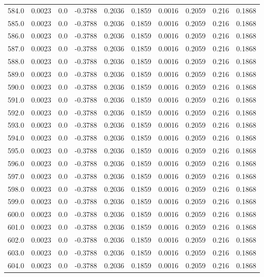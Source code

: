 \begin{longtable}{lrrrrrrrrr}
584.0 & 0.0023 & 0.0 & -0.3788 & 0.2036 & 0.1859 & 0.0016 & 0.2059 & 0.216 & 0.1868 \\
585.0 & 0.0023 & 0.0 & -0.3788 & 0.2036 & 0.1859 & 0.0016 & 0.2059 & 0.216 & 0.1868 \\
586.0 & 0.0023 & 0.0 & -0.3788 & 0.2036 & 0.1859 & 0.0016 & 0.2059 & 0.216 & 0.1868 \\
587.0 & 0.0023 & 0.0 & -0.3788 & 0.2036 & 0.1859 & 0.0016 & 0.2059 & 0.216 & 0.1868 \\
588.0 & 0.0023 & 0.0 & -0.3788 & 0.2036 & 0.1859 & 0.0016 & 0.2059 & 0.216 & 0.1868 \\
589.0 & 0.0023 & 0.0 & -0.3788 & 0.2036 & 0.1859 & 0.0016 & 0.2059 & 0.216 & 0.1868 \\
590.0 & 0.0023 & 0.0 & -0.3788 & 0.2036 & 0.1859 & 0.0016 & 0.2059 & 0.216 & 0.1868 \\
591.0 & 0.0023 & 0.0 & -0.3788 & 0.2036 & 0.1859 & 0.0016 & 0.2059 & 0.216 & 0.1868 \\
592.0 & 0.0023 & 0.0 & -0.3788 & 0.2036 & 0.1859 & 0.0016 & 0.2059 & 0.216 & 0.1868 \\
593.0 & 0.0023 & 0.0 & -0.3788 & 0.2036 & 0.1859 & 0.0016 & 0.2059 & 0.216 & 0.1868 \\
594.0 & 0.0023 & 0.0 & -0.3788 & 0.2036 & 0.1859 & 0.0016 & 0.2059 & 0.216 & 0.1868 \\
595.0 & 0.0023 & 0.0 & -0.3788 & 0.2036 & 0.1859 & 0.0016 & 0.2059 & 0.216 & 0.1868 \\
596.0 & 0.0023 & 0.0 & -0.3788 & 0.2036 & 0.1859 & 0.0016 & 0.2059 & 0.216 & 0.1868 \\
597.0 & 0.0023 & 0.0 & -0.3788 & 0.2036 & 0.1859 & 0.0016 & 0.2059 & 0.216 & 0.1868 \\
598.0 & 0.0023 & 0.0 & -0.3788 & 0.2036 & 0.1859 & 0.0016 & 0.2059 & 0.216 & 0.1868 \\
599.0 & 0.0023 & 0.0 & -0.3788 & 0.2036 & 0.1859 & 0.0016 & 0.2059 & 0.216 & 0.1868 \\
600.0 & 0.0023 & 0.0 & -0.3788 & 0.2036 & 0.1859 & 0.0016 & 0.2059 & 0.216 & 0.1868 \\
601.0 & 0.0023 & 0.0 & -0.3788 & 0.2036 & 0.1859 & 0.0016 & 0.2059 & 0.216 & 0.1868 \\
602.0 & 0.0023 & 0.0 & -0.3788 & 0.2036 & 0.1859 & 0.0016 & 0.2059 & 0.216 & 0.1868 \\
603.0 & 0.0023 & 0.0 & -0.3788 & 0.2036 & 0.1859 & 0.0016 & 0.2059 & 0.216 & 0.1868 \\
604.0 & 0.0023 & 0.0 & -0.3788 & 0.2036 & 0.1859 & 0.0016 & 0.2059 & 0.216 & 0.1868 \\

\end{longtable}

